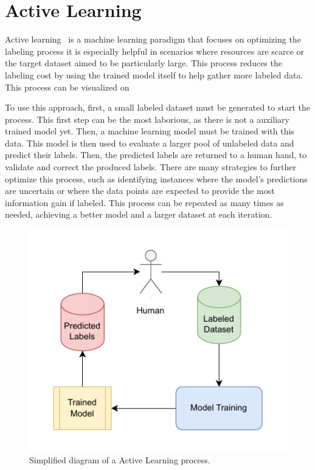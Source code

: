 \section{Active Learning}

Active learning~\cite{10537213} is a machine learning paradigm that focuses on optimizing the labeling process it is especially helpful in scenarios where resources are scarce or the target dataset aimed to be particularly large. This process reduces the labeling cost by using the trained model itself to help gather more labeled data. This process can be visualized on 

To use this approach, first, a small labeled dataset must be generated to start the process. This first step can be the most laborious, as there is not a auxiliary trained model yet. Then, a machine learning model must be trained with this data. This model is then used to evaluate a larger pool of unlabeled data and predict their labels. Then, the predicted labels are returned to a human hand, to validate and correct the produced labels. There are many strategies to further optimize this process, such as identifying instances where the model's predictions are uncertain or where the data points are expected to provide the most information gain if labeled. This process can be repeated as many times as needed, achieving a better model and a larger dataset at each iteration.

\begin{figure}[htbp]
\label{fig:activelearning}
\centering
\includegraphics[width=.6\linewidth]{images/active_learning.drawio.pdf}
\caption{Simplified diagram of a Active Learning process.}
\end{figure}